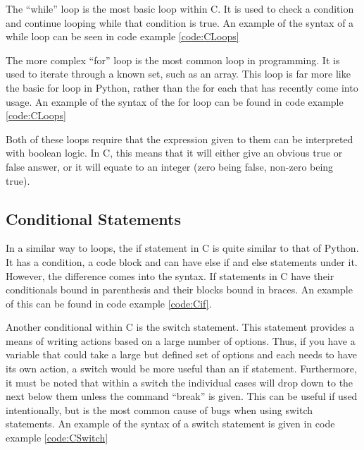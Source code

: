 			The ``while'' loop is the most basic loop within C. 
			It is used to check a condition and continue looping while that condition is true. 
			An example of the syntax of a while loop can be seen in code example \ref{code:CLoops}

			The more complex ``for'' loop is the most common loop in programming. 
			It is used to iterate through a known set, such as an array. 
			This loop is far more like the basic for loop in Python, rather than the for each that has recently come into usage. 
			An example of the syntax of the for loop can be found in code example \ref{code:CLoops}
			
			Both of these loops require that the expression given to them can be interpreted with boolean logic. 
			In C, this means that it will either give an obvious true or false answer, or it will equate to an integer (zero being false, non-zero being true).

			\begin{code}
				C}]{./CLoops.c}
				\caption{Examples of Basic C Loops}
				\label{code:CLoops}
			\end{code}
		\subsection{Conditional Statements}
			In a similar way to loops, the if statement in C is quite similar to that of Python. 
			It has a condition, a code block and can have else if and else statements under it. 
			However, the difference comes into the syntax. 
			If statements in C have their conditionals bound in parenthesis and their blocks bound in braces. 
			An example of this can be found in code example \ref{code:Cif}.

			\begin{code}
				C}]{./if.c}
				\caption{Example of the C if statement}
				\label{code:Cif}
			\end{code}

			Another conditional within C is the switch statement. 
			This statement provides a means of writing actions based on a large number of options. 
			Thus, if you have a variable that could take a large but defined set of options and each needs to have its own action, a switch would be more useful than an if statement. 
			Furthermore, it must be noted that within a switch the individual cases will drop down to the next below them unless the command ``break'' is given. 
			This can be useful if used intentionally, but is the most common cause of bugs when using switch statements. 
			An example of the syntax of a switch statement is given in code example \ref{code:CSwitch}


